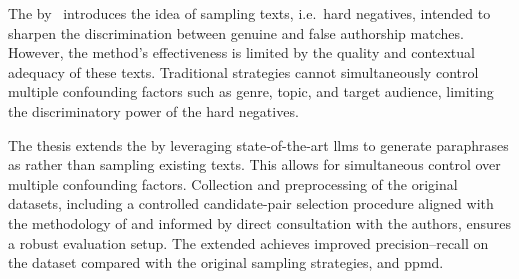 The \impAppr{} by \citet{koppel_determining_2014}\ introduces the idea of sampling \imp{} texts, i.e.\ hard negatives, intended to sharpen the discrimination between genuine and false authorship matches. 
However, the method's effectiveness is limited by the quality and contextual adequacy of these \imp{} texts. 
Traditional strategies cannot simultaneously control multiple confounding factors such as genre, topic, and target audience, limiting the discriminatory power of the hard negatives.

The thesis extends the \impAppr{} by leveraging state-of-the-art \acp{llm} to generate paraphrases as \imps{} rather than sampling existing texts.
This allows for simultaneous control over multiple confounding factors.
Collection and preprocessing of the original datasets, including a controlled candidate-pair selection procedure aligned with the methodology of \citet{koppel_determining_2014} and informed by direct consultation with the authors, ensures a robust evaluation setup. 
The extended \impAppr{} achieves improved precision–recall on the \dataStudent{} dataset compared with the original sampling strategies, \unmasking{} and \acs{ppmd}.
